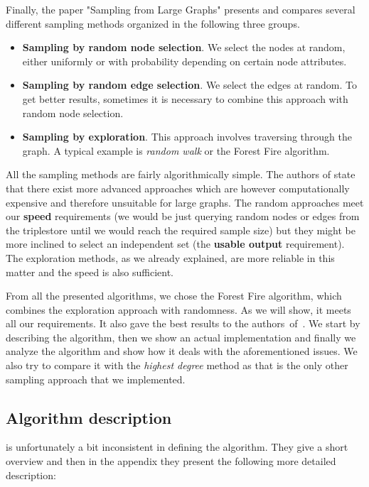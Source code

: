 Finally, the paper  "Sampling from Large Graphs" \cite{leskovec2006sampling} presents and compares several different sampling methods organized in the following three groups.

\begin{itemize}
\item \textbf{Sampling by random node selection}. We select the nodes at random, either uniformly or with probability depending on certain node attributes.
\item \textbf{Sampling by random edge selection}. We select the edges at random. To get better results, sometimes it is necessary to combine this approach with random node selection.
\item \textbf{Sampling by exploration}. This approach involves traversing through the graph. A typical example is \emph{random walk} or the Forest Fire algorithm.
\end{itemize}

All the sampling methods are fairly algorithmically simple. The authors of \cite{leskovec2006sampling} state that there exist more advanced approaches which are however computationally expensive and therefore unsuitable for large graphs. The random approaches meet our \textbf{speed} requirements (we would be just querying random nodes or edges from the triplestore until we would reach the required sample size) but they might be more inclined to select an independent set (the \textbf{usable output} requirement). The exploration methods, as we already explained, are more reliable in this matter and the speed is also sufficient.

From all the presented algorithms, we chose the Forest Fire algorithm, which combines the exploration approach with randomness. As we will show, it meets all our requirements. It also gave the best results to the authors~of~\cite{leskovec2006sampling}. We start by describing the algorithm, then we show an actual implementation and finally we analyze the algorithm and show how it deals with the aforementioned issues. We also try to compare it with the \emph{highest degree} method as that is the only other sampling approach that we implemented.

\subsection{Algorithm description}

\cite{leskovec2006sampling} is unfortunately a bit inconsistent in defining the algorithm. They give a short overview and then in the appendix they present the following more detailed description:

